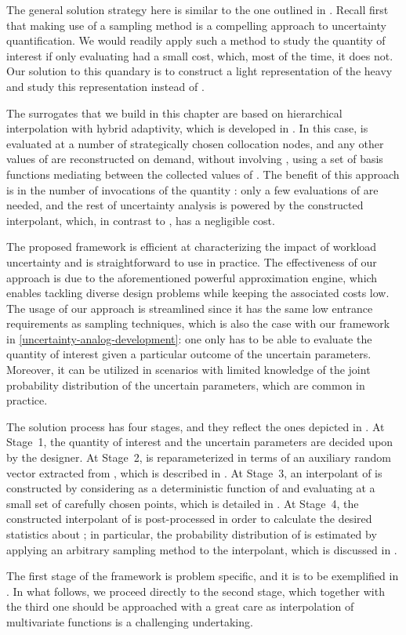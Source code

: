The general solution strategy here is similar to the one outlined in
. Recall first that making use of a sampling method is a
compelling approach to uncertainty quantification. We would readily apply such a
method to study the quantity of interest \g if only evaluating \g had a small
cost, which, most of the time, it does not. Our solution to this quandary is to
construct a light representation of the heavy \g and study this representation
instead of \g.

The surrogates that we build in this chapter are based on hierarchical
interpolation with hybrid adaptivity, which is developed in \cite{klimke2006,
ma2009, jakeman2012}. In this case, \g is evaluated at a number of strategically
chosen collocation nodes, and any other values of \g are reconstructed on
demand, without involving \g, using a set of basis functions mediating between
the collected values of \g. The benefit of this approach is in the number of
invocations of the quantity \g: only a few evaluations of \g are needed, and the
rest of uncertainty analysis is powered by the constructed interpolant, which,
in contrast to \g, has a negligible cost.

The proposed framework is efficient at characterizing the impact of workload
uncertainty and is straightforward to use in practice. The effectiveness of our
approach is due to the aforementioned powerful approximation engine, which
enables tackling diverse design problems while keeping the associated costs low.
The usage of our approach is streamlined since it has the same low entrance
requirements as sampling techniques, which is also the case with our framework
in \cref{uncertainty-analog-development}: one only has to be able to evaluate
the quantity of interest given a particular outcome of the uncertain parameters.
Moreover, it can be utilized in scenarios with limited knowledge of the joint
probability distribution of the uncertain parameters, which are common in
practice.

The solution process has four stages, and they reflect the ones depicted in
. At Stage~1, the quantity of interest \g and the uncertain
parameters \vu are decided upon by the designer. At Stage~2, \g is
reparameterized in terms of an auxiliary random vector \vz extracted from \vu,
which is described in . At Stage~3, an interpolant of
\g is constructed by considering \g as a deterministic function of \vz and
evaluating \g at a small set of carefully chosen points, which is detailed in
. At Stage~4, the constructed interpolant of \g is
post-processed in order to calculate the desired statistics about \g; in
particular, the probability distribution of \g is estimated by applying an
arbitrary sampling method to the interpolant, which is discussed in
.

The first stage of the framework is problem specific, and it is to be
exemplified in . In what follows, we proceed directly to
the second stage, which together with the third one should be approached with a
great care as interpolation of multivariate functions is a challenging
undertaking.
